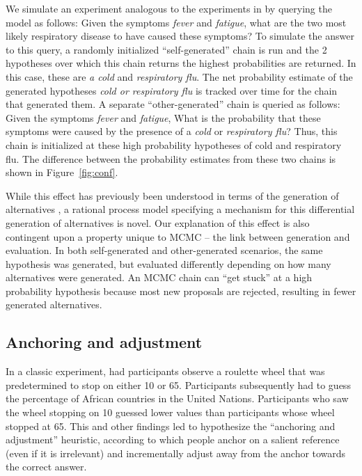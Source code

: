 We simulate an experiment analogous to the experiments in \citet{conf} by querying the model as follows: Given  the symptoms \emph{fever} and \emph{fatigue}, what are the two most likely respiratory disease to have caused these symptoms? To simulate the answer to this query, a randomly initialized ``self-generated'' chain is run and the 2 hypotheses over which this chain returns the highest probabilities are returned. In this case, these are \emph{a cold} and \emph{respiratory flu}. The net probability estimate of the generated hypotheses \emph{cold or respiratory flu} is tracked over time for the chain that generated them. A separate ``other-generated'' chain is queried as follows: Given the symptoms \emph{fever} and \emph{fatigue}, What is the probability that these symptoms were caused by the presence of a \textit{cold} or \textit{respiratory flu}? Thus, this chain is initialized at these high probability hypotheses of cold and respiratory flu. The difference between the probability estimates from these two chains is shown in Figure~\ref{fig:conf}.


While this effect has previously been understood in terms of the generation of alternatives \citep{conf}, a rational process model specifying a mechanism for this differential generation of alternatives is novel. 
Our explanation of this effect is also contingent upon a property unique to MCMC -- the link between generation and evaluation. In both self-generated and other-generated scenarios, the same hypothesis was generated, but evaluated differently depending on how many alternatives were generated. An MCMC chain can ``get stuck'' at a high probability hypothesis because most new proposals are rejected, resulting in fewer generated alternatives. 


\subsection{Anchoring and adjustment}

In a classic experiment, \citet{tversky} had participants observe a roulette wheel that was predetermined to stop on either 10 or 65. Participants subsequently had to guess the percentage of African countries in the United Nations. Participants who saw the wheel stopping on 10 guessed lower values than participants whose wheel stopped at 65. This and other findings led \citet{tversky} to hypothesize the ``anchoring and adjustment'' heuristic, according to which people anchor on a salient reference (even if it is irrelevant) and incrementally adjust away from the anchor towards the correct answer.

